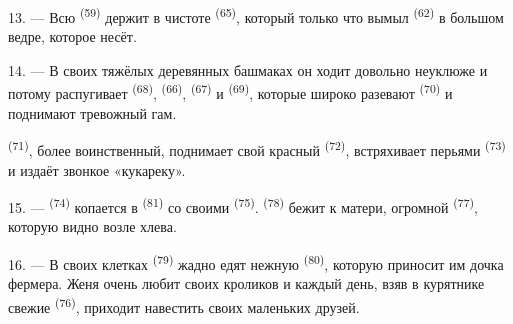 13. --- Всю  \textsuperscript{(59)} держит в чистоте
 \textsuperscript{(65)}, который только что вымыл 
\textsuperscript{(62)} в большом ведре, которое несёт.

\VUsaut{3.0mm}
\VUsaut{3.0mm}

14. --- В своих тяжёлых деревянных башмаках он ходит довольно неуклюже и
потому распугивает  \textsuperscript{(68)}, 
\textsuperscript{(66)},  \textsuperscript{(67)} и 
\textsuperscript{(69)}, которые широко разевают  \textsuperscript{(70)}
и поднимают тревожный гам.

 \textsuperscript{(71)}, более воинственный, поднимает свой красный
 \textsuperscript{(72)}, встряхивает перьями 
\textsuperscript{(73)} и издаёт звонкое «кукареку».

15. ---  \textsuperscript{(74)} копается в 
\textsuperscript{(81)} со своими  \textsuperscript{(75)}.
 \textsuperscript{(78)} бежит к матери, огромной
 \textsuperscript{(77)}, которую видно возле хлева.

16. --- В своих клетках  \textsuperscript{(79)} жадно едят нежную
 \textsuperscript{(80)}, которую приносит им дочка фермера. Женя
очень любит своих кроликов и каждый день, взяв в курятнике свежие
 \textsuperscript{(76)}, приходит навестить своих маленьких друзей.
\VUsaut{6.0mm}
\VUfilet{22mm}
